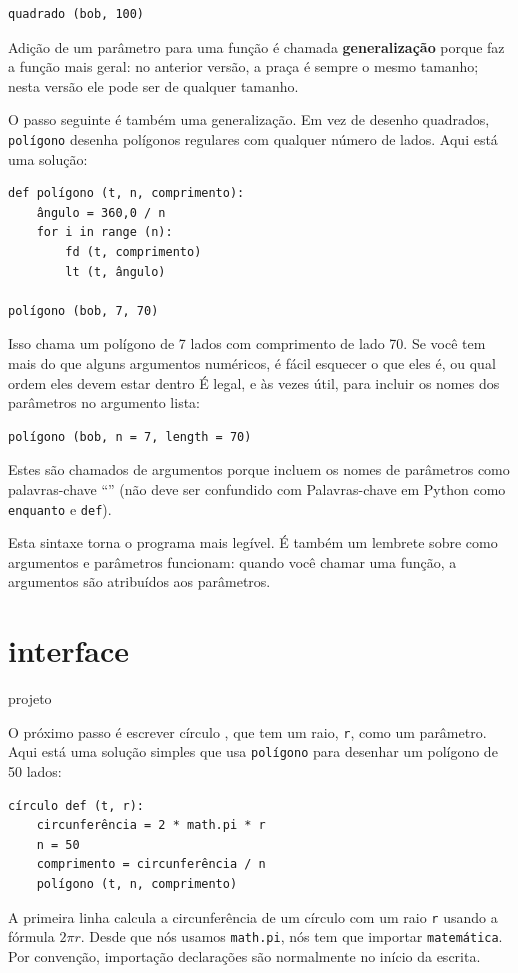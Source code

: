 \documentclass[10pt]{book}
\begin{document}
\begin{exercise}
\begin{verbatim}
quadrado (bob, 100)
\end{verbatim}
%
Adição de um parâmetro para uma função é chamada {\bf generalização}
porque faz a função mais geral: no anterior
versão, a praça é sempre o mesmo tamanho; nesta versão
ele pode ser de qualquer tamanho.

O passo seguinte é também uma generalização. Em vez de desenho
quadrados, {\tt polígono} desenha polígonos regulares com qualquer número de
lados. Aqui está uma solução:

\begin{verbatim}
def polígono (t, n, comprimento):
    ângulo = 360,0 / n
    for i in range (n):
        fd (t, comprimento)
        lt (t, ângulo)

polígono (bob, 7, 70)
\end{verbatim}
%
Isso chama um polígono de 7 lados com comprimento de lado 70. Se você tem
mais do que alguns argumentos numéricos, é fácil esquecer o que eles
é, ou qual ordem eles devem estar dentro É legal, e às vezes
útil, para incluir os nomes dos parâmetros no argumento
lista:

\begin{verbatim}
polígono (bob, n = 7, length = 70)
\end{verbatim}
%
Estes são chamados de argumentos {\bf} porque incluem
os nomes de parâmetros como palavras-chave ``'' (não deve ser confundido com
Palavras-chave em Python como {\tt enquanto} e {\tt def}).

Esta sintaxe torna o programa mais legível. É também um lembrete
sobre como argumentos e parâmetros funcionam: quando você chamar uma função, a
argumentos são atribuídos aos parâmetros.


\section{interface} projeto

O próximo passo é escrever {círculo \tt}, que tem um raio,
{\tt r}, como um parâmetro. Aqui está uma solução simples que usa
{\tt polígono} para desenhar um polígono de 50 lados:

\begin{verbatim}
círculo def (t, r):
    circunferência = 2 * math.pi * r
    n = 50
    comprimento = circunferência / n
    polígono (t, n, comprimento)
\end{verbatim}
%
A primeira linha calcula a circunferência de um círculo com um raio
{\tt r} usando a fórmula $2 \pi r$. Desde que nós usamos {\tt math.pi}, nós
tem que importar {\tt matemática}. Por convenção, {importação \tt} declarações
são normalmente no início da escrita.


\end{exercise}
\end{document}
